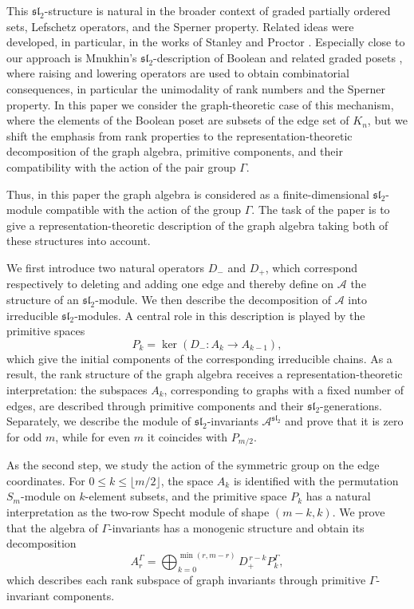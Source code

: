 \documentclass[12pt,reqno]{amsart}
\begin{document}
This $\mathfrak{sl}_2$-structure is natural in the broader context of graded
partially ordered sets, Lefschetz operators, and the Sperner property. Related
ideas were developed, in particular, in the works of Stanley and Proctor
\cite{Stanley1980,Proctor1982}. Especially close to our approach is
Mnukhin's $\mathfrak{sl}_2$-description of Boolean and related graded posets
\cite{Mnukhin1993}, where raising and lowering operators are used to obtain
combinatorial consequences, in particular the unimodality of rank numbers and
the Sperner property. In this paper we consider the graph-theoretic case of
this mechanism, where the elements of the Boolean poset are subsets of the
edge set of $K_n$, but we shift the emphasis from rank properties to the
representation-theoretic decomposition of the graph algebra, primitive
components, and their compatibility with the action of the pair group
$\Gamma$.

Thus, in this paper the graph algebra is considered as a finite-dimensional
$\mathfrak{sl}_2$-module compatible with the action of the group $\Gamma$.
The task of the paper is to give a representation-theoretic description of
the graph algebra taking both of these structures into account.

We first introduce two natural operators $D_-$ and $D_+$, which correspond
respectively to deleting and adding one edge and thereby define on
$\mathcal A$ the structure of an $\mathfrak{sl}_2$-module. We then describe
the decomposition of $\mathcal A$ into irreducible $\mathfrak{sl}_2$-modules.
A central role in this description is played by the primitive spaces
$$
P_k=\ker(D_-:A_k\to A_{k-1}),
$$
which give the initial components of the corresponding irreducible chains.
As a result, the rank structure of the graph algebra receives a
representation-theoretic interpretation: the subspaces $A_k$, corresponding
to graphs with a fixed number of edges, are described through primitive
components and their $\mathfrak{sl}_2$-generations. Separately, we describe
the module of $\mathfrak{sl}_2$-invariants
$\mathcal A^{\mathfrak{sl}_2}$ and prove that it is zero for odd $m$, while
for even $m$ it coincides with $P_{m/2}$.

As the second step, we study the action of the symmetric group on the edge
coordinates. For $0\le k\le \lfloor m/2\rfloor$, the space $A_k$ is
identified with the permutation $S_m$-module on $k$-element subsets, and the
primitive space $P_k$ has a natural interpretation as the two-row Specht module
of shape $(m-k,k)$. We prove that the algebra of $\Gamma$-invariants has a
monogenic structure and obtain its decomposition
$$
A_r^\Gamma
=
\bigoplus_{k=0}^{\min(r,m-r)}
D_+^{\,r-k}P_k^\Gamma,
$$
which describes each rank subspace of graph invariants through primitive
$\Gamma$-invariant components.
\end{document}
